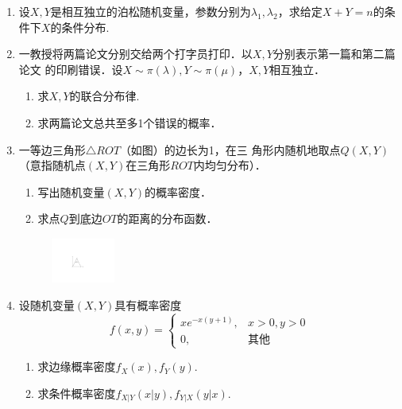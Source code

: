 \documentclass[10pt,a4paper]{article}
\begin{document}
\begin{enumerate}
    \item 设$X,Y$是相互独立的泊松随机变量，参数分别为$\lambda_1,\lambda_2$，求给定$X+Y=n$的条件下$X$的条件分布.
    




    \item 一教授将两篇论文分别交给两个打字员打印．以$X,Y$分别表示第一篇和第二篇论文
    的印刷错误．设$X\sim \pi(\lambda),Y\sim \pi(\mu)$，$X,Y$相互独立．
    \begin{enumerate}
        \item 求$X,Y$的联合分布律.
        \item 求两篇论文总共至多1个错误的概率．
    \end{enumerate}



    \item 一等边三角形$\triangle ROT$（如图）的边长为1，在三
    角形内随机地取点$Q(X,Y)$ （意指随机点$(X,Y)$在三角形$ROT$内均匀分布）．
    \begin{enumerate}
        \item 写出随机变量$(X,Y)$的概率密度．
        \item 求点$Q$到底边$OT$的距离的分布函数．
    \end{enumerate}
    \begin{figure}[H]
        \flushright 
        \includegraphics[width=0.2\textwidth]{25.pdf}
    \end{figure}
    \vspace{-0.5cm}



    \item 设随机变量$(X,Y)$具有概率密度
    $$f(x,y)=\left\{\begin{array}{ll}
        xe^{-x(y+1)}, & x>0,y>0\\
        0, & \mbox{其他} 
    \end{array}\right.$$
    \begin{enumerate}
        \item 求边缘概率密度$f_X(x),f_Y(y)$.
        \item 求条件概率密度$f_{X|Y}(x|y),f_{Y|X}(y|x)$.
    \end{enumerate}




\end{enumerate}
\end{document}
